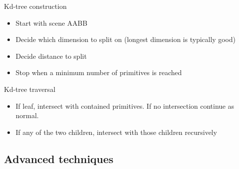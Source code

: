 \documentclass[12pt]{article}
\begin{document}
Kd-tree construction
\begin{itemize}
    \item Start with scene AABB
    \item Decide which dimension to split on (longest dimension is
        typically good)
    \item Decide distance to split
    \item Stop when a minimum number of primitives is reached
\end{itemize}

Kd-tree traversal
\begin{itemize}
    \item If leaf, intersect with contained primitives. If no intersection
        continue as normal.
    \item If any of the two children, intersect with those children recursively
\end{itemize}

\subsection{Advanced techniques}
\end{document}

